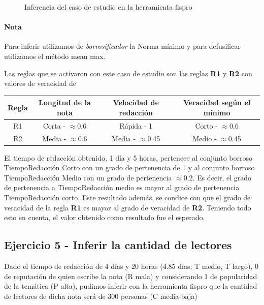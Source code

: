 \documentclass{article}
\begin{document}
\begin{itemize}
\begin{figure}[H]
	\centering
	\caption{Inferencia del caso de estudio en la herramienta fispro}
\end{figure}

\paragraph{Nota} Para inferir utilizamos de \textit{borrosificador} la Norma mínimo y para defusificar utilizamos el método mean max.

\vspace{3mm}
Las reglas que se activaron con este caso de estudio son las reglas \textbf{R1} y \textbf{R2} con valores de veracidad de

\begin{table}[H]
	\centering
	\begin{tabular}{c|c c|c}
		Regla&Longitud de la nota&Velocidad de redacción&Veracidad según el mínimo\\
		\hline
		R1&Corta - $\approx$0.6&Rápida - 1&Corto - $\approx$0.6\\
		R2&Media - $\approx$0.6&Media - $\approx$0.45&Medio - $\approx$0.45\\
	\end{tabular}
\end{table}

El tiempo de redacción obtenido, 1 día y 5 horas, pertenece al conjunto borroso TiempoRedacción Corto con un grado de pertenencia de 1 y al conjunto borroso TiempoRedacción Medio con un grado de pertenencia $\approx$0.2. Es decir, el grado de pertenencia a TiempoRedacción medio es mayor al grado de pertenencia TiempoRedacción corto. Este resultado además, se condice con que el grado de veracidad de la regla \textbf{R1} es mayor al grado de veracidad de \textbf{R2}. Teniendo todo esto en cuenta, el valor obtenido como resultado fue el esperado.

\pagebreak
\subsection*{Ejercicio 5 - Inferir la cantidad de lectores}
Dado el tiempo de redacción de 4 días y 20 horas (4.85 días; T medio, T largo), 0 de reputación de quien escribe la nota (R mala) y considerando 1 de popularidad de la temática (P alta), pudimos inferir con la herramienta fispro que la cantidad de lectores de dicha nota será de 300 personas (C media-baja)


\end{itemize}
\end{document}
